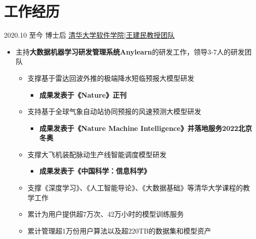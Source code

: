 \documentclass[letterpaper]{twentysecondcv} %
\begin{document}
\vspace{-0.6cm}
\section{工作经历}

\begin{twentyfluid}

\twentyitemfluid
    {2020.10 至今}
    {博士后}
    {\href{https://www.thss.tsinghua.edu.cn/index.htm}{清华大学软件学院|王建民教授团队}}
    {\\     }
    {
    {
    \vspace{-0.2cm}
    \begin{itemize}
        \item 主持\textbf{大数据机器学习研发管理系统Anylearn}的研发工作，领导3-7人的研发团队
        \begin{itemize}
            \item 支撑基于雷达回波外推的极端降水短临预报大模型研发
            \begin{itemize}
                \item \textbf{成果发表于《Nature》正刊}
            \end{itemize}
            \item 支持基于全球气象自动站协同预报的风速预测大模型研发
            \begin{itemize}
                \item \textbf{成果发表于《Nature Machine Intelligence》并落地服务2022北京冬奥}
            \end{itemize}
            \item 支撑大飞机装配脉动生产线智能调度模型研发
            \begin{itemize}
                \item \textbf{成果发表于《中国科学：信息科学》}
            \end{itemize}
            \item 支撑《深度学习》、《人工智能导论》、《大数据基础》等清华大学课程的教学工作
            \item 累计为用户提供超7万次、42万小时的模型训练服务
            \item 累计管理超1万份用户算法以及超220TB的数据集和模型资产
        \end{itemize}

\end{itemize}}}
\end{twentyfluid}
\end{document}
